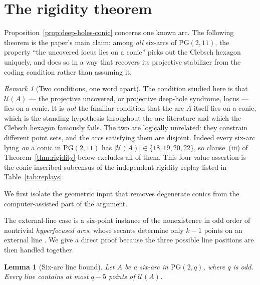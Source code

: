 \documentclass[11pt]{article}
\newtheorem{lemma}[theorem]{Lemma}
\theoremstyle{definition}
\theoremstyle{remark}
\newtheorem{remark}[theorem]{Remark}
\newcommand{\PG}{\mathrm{PG}}
\newcommand{\cU}{\mathcal{U}}
\begin{document}
\section{The rigidity theorem}
\label{sec:rigidity}

Proposition~\ref{prop:deep-holes-conic} concerns one known arc. The following theorem is the
paper's main claim: among \emph{all} six-arcs of $\PG(2,11)$, the property
``the uncovered locus lies on a conic'' picks out the
Clebsch hexagon uniquely, and does so in a way that recovers its projective
stabilizer from the coding condition rather than assuming it.

\begin{remark}[Two conditions, one word apart]
\label{rem:not-the-usual-condition}
The condition studied here is that $\cU(A)$ --- the projective uncovered,
or projective deep-hole syndrome, locus --- lies on a conic. It is
\emph{not} the familiar condition that the arc $A$ itself
lies on a conic, which is the standing hypothesis throughout the arc
literature and which the Clebsch hexagon famously fails. The two are
logically unrelated: they constrain different point sets, and the arcs
satisfying them are disjoint. Indeed every six-arc lying \emph{on} a conic in
$\PG(2,11)$ has $|\cU(A)|\in\{18,19,20,22\}$, so clause~(iii) of
Theorem~\ref{thm:rigidity} below excludes all of them. This four-value assertion is
the conic-inscribed subcensus of the independent rigidity replay listed in
Table~\ref{tab:replays}.
\end{remark}

We first isolate the geometric input that removes degenerate conics from the
computer-assisted part of the argument.

The external-line case is a six-point instance of the nonexistence in odd
order of nontrivial \emph{hyperfocused arcs}, whose secants determine only
$k-1$ points on an external line
\cite{BicharaKorchmaros1982,DrakeKeating2004,NgWild2001}. We give a direct
proof because the three possible line positions are then handled together.

\begin{lemma}[Six-arc line bound]
\label{lem:six-arc-line-bound}
Let $A$ be a six-arc in $\PG(2,q)$, where $q$ is odd. Every line contains at
most $q-5$ points of $\cU(A)$.
\end{lemma}
\end{document}
